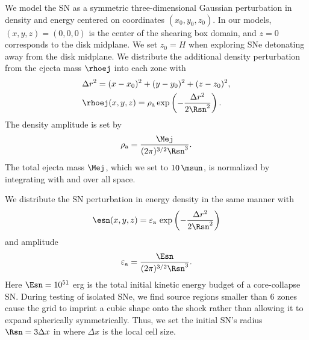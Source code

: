 
We model the SN as a symmetric three-dimensional Gaussian perturbation in density and energy centered on coordinates $(x_0, y_0, z_0)$.
In our models, $(x, y, z) = (0, 0, 0)$ is the center of the shearing box domain, and $z=0$ corresponds to the disk midplane.
We set $z_0=H$ when exploring SNe detonating away from the disk midplane.
We distribute the additional density perturbation from the ejecta mass $\rhoej$ into each zone with
\begin{eqnarray}
    &\Delta r^2 = (x-x_0)^2 + (y-y_0)^2 + (z-z_0)^2, \label{eqn:sn-radius}\\
    &\rhoej (x, y, z) = \rho_{\rm a}\,  {\rm exp}\left(-\frac{\Delta r^2}{2 \Rsn^2}\right). \label{eqn:ejecta-gauss}
\end{eqnarray}
The density amplitude is set by
\begin{equation} \label{eqn:ejecta-amplitude}
    \rho_{\rm a} = \frac{\Mej}{(2 \pi)^{3/2} \Rsn^3}. 
\end{equation}
The total ejecta mass $\Mej$, which we set to $10\,\msun$, is normalized by integrating  with  and  over all space.

We distribute the SN perturbation in energy density in the same manner with
\begin{equation} \label{eqn:energy-gauss}
    \esn (x, y, z) = \varepsilon_{\rm a}\, \exp\left(-\frac{\Delta r^2}{2 \Rsn^2}\right)
\end{equation}
and amplitude
\begin{equation} \label{eqn:energy-amplitude}
    \varepsilon_{\rm a} = \frac{ \Esn }{ (2 \pi)^{3/2} \Rsn^3 }. 
\end{equation}
Here $\Esn = 10^{51}$ erg is the total initial kinetic energy budget of a core-collapse SN.
During testing of isolated SNe, we find source regions smaller than 6 zones cause the grid to imprint a cubic shape onto the shock rather than allowing it to expand spherically symmetrically.
Thus, we set the initial SN's radius $\Rsn = 3\Delta x$ in  where $\Delta x$ is the local cell size.


